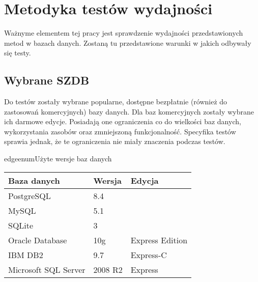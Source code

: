 \chapter{Metodyka testów wydajności}

Ważnyme elementem tej pracy jest sprawdzenie wydajności przedstawionych metod w bazach danych.
Zostaną tu przedstawione warunki w jakich odbywały się testy.

\section*{Wybrane SZDB}

Do testów zostały wybrane popularne, dostępne bezpłatnie (również do zastosowań komercyjnych) bazy danych. 
Dla baz komercyjnych zostały wybrane ich darmowe edycje. 
Posiadają one ograniczenia co do wielkości baz danych, wykorzystania zasobów oraz zmniejszoną funkcjonalność. 
Specyfika testów sprawia jednak, że te ograniczenia nie miały znaczenia podczas testów.





\begin{qxtab}{edgeenum}{Użyte wersje baz danych}
\begin{tabular}{l|l|l}
Baza danych                            & Wersja & Edycja \\
\hline
PostgreSQL\index{PostgreSQL}           &  8.4      & \\
MySQL\index{MySQL}                     &  5.1      & \\
SQLite\index{SQLite}                   &  3        & \\
Oracle Database\index{Oracle}          &  10g      & Express Edition \\
IBM DB2\index{IBM DB2}                 &  9.7      & Express-C \\
Microsoft SQL Server\index{SQL Server} &  2008 R2  & Express\\
\end{tabular}
\end{qxtab}

